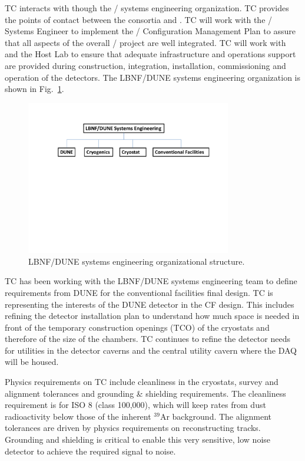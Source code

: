  TC interacts with  though the
/ systems engineering organization. TC
provides the points of contact between the consortia and .
TC will work with the / Systems Engineer to
implement the / Configuration Management Plan
to assure that all aspects of the overall /
project are well integrated. TC will work with  and the
Host Lab to ensure that adequate infrastructure and operations support
are provided during construction, integration, installation,
commissioning and operation of the detectors. The LBNF/DUNE systems
engineering organization is shown in Fig.~\ref{fig:DUNE_SE_org}.
\begin{figure}[htb]
  \begin{center}
    \includegraphics[width=0.8\textwidth]{far-detector-generic/figures/TC_SE_Org_Chart}
    \caption{LBNF/DUNE systems engineering organizational structure.}
    \label{fig:DUNE_SE_org}
  \end{center}
\end{figure}
TC has been working with the LBNF/DUNE systems engineering team to
define requirements from DUNE for the conventional facilities final
design. TC is representing the interests of the DUNE detector in the
CF design. This includes refining the detector installation plan to
understand how much space is needed in front of the temporary
construction openings (TCO) of the cryostats and therefore of the size
of the chambers. TC continues to refine the detector needs for
utilities in the detector caverns and the central utility cavern where
the DAQ will be housed.

Physics requirements on TC include cleanliness in the cryostats,
survey and alignment tolerances and grounding \& shielding
requirements. The cleanliness requirement is for ISO 8 (class
100,000), which will keep rates from dust radioactivity below those of
the inherent $^39$Ar background. The alignment tolerances are driven
by physics requirements on reconstructing tracks. Grounding and
shielding is critical to enable this very sensitive, low noise
detector to achieve the required signal to noise.





